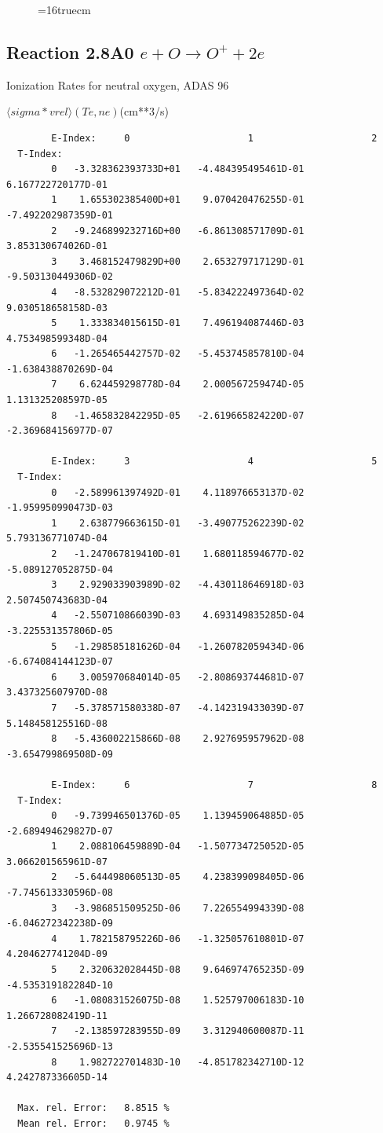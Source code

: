 \documentclass[12pt,dvips]{article}
\begin{document}
\begin{figure} \label{2.7A0}
\epsfxsize=16truecm 
\end{figure}
\newpage


\subsection{
Reaction 2.8A0 $e + O \rightarrow O^+  + 2e $ }
  Ionization Rates for neutral  oxygen,   ADAS 96

$  \langle sigma*vrel \rangle(Te,ne) $(cm**3/s)
\begin{small}\begin{verbatim}
        E-Index:     0                     1                     2
  T-Index:
        0   -3.328362393733D+01   -4.484395495461D-01    6.167722720177D-01
        1    1.655302385400D+01    9.070420476255D-01   -7.492202987359D-01
        2   -9.246899232716D+00   -6.861308571709D-01    3.853130674026D-01
        3    3.468152479829D+00    2.653279717129D-01   -9.503130449306D-02
        4   -8.532829072212D-01   -5.834222497364D-02    9.030518658158D-03
        5    1.333834015615D-01    7.496194087446D-03    4.753498599348D-04
        6   -1.265465442757D-02   -5.453745857810D-04   -1.638438870269D-04
        7    6.624459298778D-04    2.000567259474D-05    1.131325208597D-05
        8   -1.465832842295D-05   -2.619665824220D-07   -2.369684156977D-07

        E-Index:     3                     4                     5
  T-Index:
        0   -2.589961397492D-01    4.118976653137D-02   -1.959950990473D-03
        1    2.638779663615D-01   -3.490775262239D-02    5.793136771074D-04
        2   -1.247067819410D-01    1.680118594677D-02   -5.089127052875D-04
        3    2.929033903989D-02   -4.430118646918D-03    2.507450743683D-04
        4   -2.550710866039D-03    4.693149835285D-04   -3.225531357806D-05
        5   -1.298585181626D-04   -1.260782059434D-06   -6.674084144123D-07
        6    3.005970684014D-05   -2.808693744681D-07    3.437325607970D-08
        7   -5.378571580338D-07   -4.142319433039D-07    5.148458125516D-08
        8   -5.436002215866D-08    2.927695957962D-08   -3.654799869508D-09

        E-Index:     6                     7                     8
  T-Index:
        0   -9.739946501376D-05    1.139459064885D-05   -2.689494629827D-07
        1    2.088106459889D-04   -1.507734725052D-05    3.066201565961D-07
        2   -5.644498060513D-05    4.238399098405D-06   -7.745613330596D-08
        3   -3.986851509525D-06    7.226554994339D-08   -6.046272342238D-09
        4    1.782158795226D-06   -1.325057610801D-07    4.204627741204D-09
        5    2.320632028445D-08    9.646974765235D-09   -4.535319182284D-10
        6   -1.080831526075D-08    1.525797006183D-10    1.266728082419D-11
        7   -2.138597283955D-09    3.312940600087D-11   -2.535541525696D-13
        8    1.982722701483D-10   -4.851782342710D-12    4.242787336605D-14

  Max. rel. Error:   8.8515 %
  Mean rel. Error:   0.9745 %


\end{verbatim}\end{small}
\end{document}
